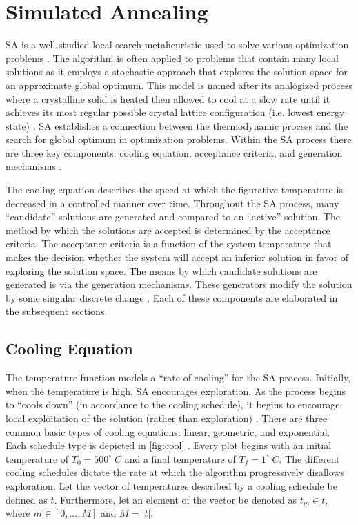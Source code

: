 \documentclass[ee,thesis]{usuthesis}
\begin{document}
\section{Simulated Annealing}
\label{sec:simulated-annealing}
SA is a well-studied local search metaheuristic used to solve various optimization problems
\cite{gendreau-2018-handb-metah,press-1992-numer-recip}. The algorithm is often applied to problems that contain many
local solutions as it employs a stochastic approach that explores the solution space for an approximate global optimum.
This model is named after its analogized process where a crystalline solid is heated then allowed to cool at a slow rate
until it achieves its most regular possible crystal lattice configuration (i.e. lowest energy state)
\cite{henderson-1989-theor-pract,press-1992-numer-recip}. SA establishes a connection between the thermodynamic
process and the search for global optimum in optimization problems. Within the SA process there are three key
components: cooling equation, acceptance criteria, and generation mechanisms
\cite{keller-2019-multi-objec,press-1992-numer-recip}.

The cooling equation describes the speed at which the figurative temperature is decreased in a controlled manner over
time. Throughout the SA process, many ``candidate'' solutions are generated and compared to an ``active'' solution. The
method by which the solutions are accepted is determined by the acceptance criteria. The acceptance criteria is a
function of the system temperature that makes the decision whether the system will accept an inferior solution in favor
of exploring the solution space. The means by which candidate solutions are generated is via the generation mechanisms.
These generators modify the solution by some singular discrete change \cite{gendreau-2018-handb-metah}. Each of these
components are elaborated in the subsequent sections.

\subsection{Cooling Equation}
\label{cooling-equation-experimental}
The temperature function models a ``rate of cooling'' for the SA process. Initially, when the temperature is high, SA
encourages exploration. As the process begins to ``cools down'' (in accordance to the cooling schedule), it begins to
encourage local exploitation of the solution (rather than exploration)
\cite{rutenbar-1989-simul-anneal-algor,henderson-1989-theor-pract}. There are three common basic types of cooling
equations: linear, geometric, and exponential. Each schedule type is depicted in \ref{fig:cool}
\cite{keller-2019-multi-objec}. Every plot begins with an initial temperature of \(T_0 = 500^\circ\; C\) and a final
temperature of \(T_f = 1^\circ\; C\). The different cooling schedules dictate the rate at which the algorithm progressively
disallows exploration. Let the vector of temperatures described by a cooling schedule be defined as \(t\). Furthermore,
let an element of the vector be denoted as \(t_m \in t\), where \(m \in [0,...,M]\) and \(M = \lvert t \rvert\).
\end{document}
